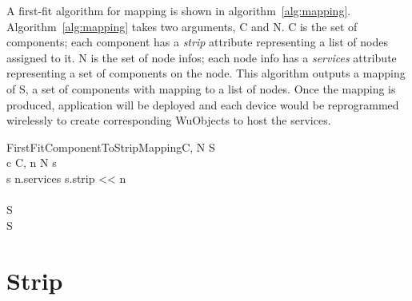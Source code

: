 A first-fit algorithm for mapping is shown in algorithm~\ref{alg:mapping}.
Algorithm~\ref{alg:mapping} takes two arguments, C and N. C is the set of
components; each component has a \textit{strip} attribute representing a list
of nodes assigned to it. N is the set of node infos; each node info has
a \textit{services} attribute representing a set of components on the node. This
algorithm outputs a mapping of S, a set of components with mapping to a list of
nodes. 
Once the mapping is produced, application will be deployed and each device would
be reprogrammed wirelessly to create corresponding WuObjects to host the
services.

\begin{pseudocode}[framebox]{FirstFitComponentToStripMapping}{C, N}
\label{alg:mapping}
S \GETS{\emptyset} \\

\FOREACH c \in C, n \in N \DO
  \BEGIN
    s  \\
    \IF s \in n.services \THEN
      \BEGIN
        s.strip << n \\
      \END \\
    S 
  \END \\

\RETURN S
\end{pseudocode}


\section{Strip}
\label{s:ss}

